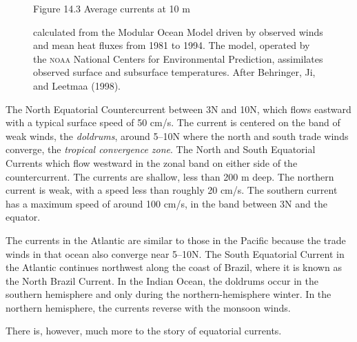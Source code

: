 \begin{figure}[t!]
\footnotesize
Figure 14.3 Average currents at 10 m \rule{0pt}{3ex}calculated from
the Modular Ocean Model driven by observed winds and mean heat fluxes from
1981 to 1994. The model, operated by the \textsc{noaa} National Centers for
Environmental Prediction, assimilates observed surface and subsurface
temperatures. After Behringer, Ji, and Leetmaa (1998).
\label{fig:EqCurr}
\vspace{-4ex}
\end{figure}

\begin{enumerate}
\vitem The North Equatorial Countercurrent between 3\degrees N and 10\degrees N, which flows eastward with a typical
surface speed of 50 cm/s. The current is centered on the band of weak winds, the
\textit{doldrums}, around 5--10\degrees N where the north and south trade winds converge, the
\textit{tropical convergence zone}. \vitem The North and South Equatorial
Currents which flow westward in the zonal band on either side of the countercurrent. The currents are shallow, less
than 200 m deep. The northern current is weak, with a speed less than roughly 20 cm/s.
The southern current has a maximum speed of around 100 cm/s, in the band between 3\degrees N
and the equator.
\end{enumerate}

The currents in the Atlantic are similar to those in the Pacific because the
trade winds in that ocean also converge near 5\degrees --10\degrees N.
The South Equatorial Current in the Atlantic continues northwest along the
coast of Brazil, where it is known as the North Brazil Current. In the Indian
Ocean, the doldrums occur in the southern hemisphere and only during the
northern-hemisphere winter. In the northern hemisphere, the currents reverse
with the monsoon winds.

There is, however, much more to the story of equatorial currents.


